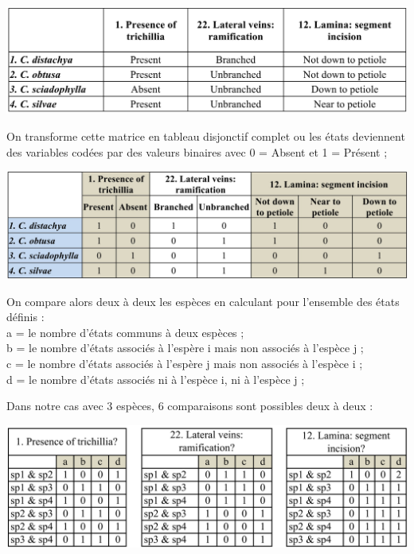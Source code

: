 \documentclass[a4paper]{article}
\theoremstyle{definition}
\theoremstyle{definition}
\theoremstyle{definition}
\theoremstyle{remark}
\begin{document}
\begin{center}\includegraphics[width=1\linewidth]{figure/ex1} \end{center}

On transforme cette matrice en tableau disjonctif complet ou les états
deviennent des variables codées par des valeurs binaires avec 0 = Absent
et 1 = Présent ;

\begin{center}\includegraphics[width=1\linewidth]{figure/ex2} \end{center}

On compare alors deux à deux les espèces en calculant pour l'ensemble
des états définis :\\
a = le nombre d'états communs à deux espèces ;\\
b = le nombre d'états associés à l'espère i mais non associés à l'espèce
j ;\\
c = le nombre d'états associés à l'espère j mais non associés à l'espèce
i ;\\
d = le nombre d'états associés ni à l'espèce i, ni à l'espèce j ;

Dans notre cas avec 3 espèces, 6 comparaisons sont possibles deux à deux
:

\begin{center}\includegraphics[width=1\linewidth]{figure/ex3} \end{center}
\end{document}
